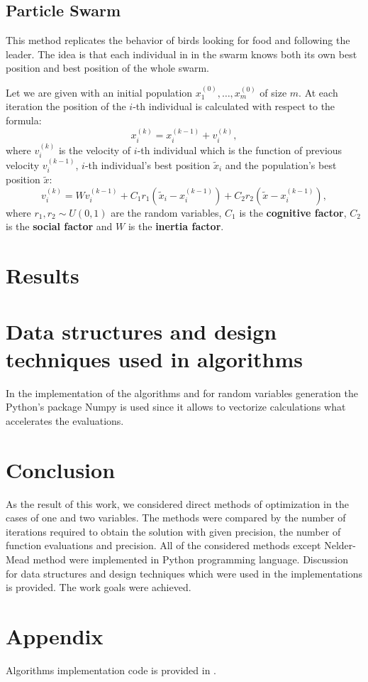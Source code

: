 \documentclass[12pt, bachelor, substylefile = algo_title.rtx]{disser}
\theoremstyle{definition}
\begin{document}
\subsection{Particle Swarm}
This method replicates the behavior of birds looking for food and following the leader. The idea is that each individual in in the swarm knows both its own best position and best position of the whole swarm.

Let we are given with an initial population $x^{(0)}_1, \dots, x^{(0)}_m$ of size $m$. At each iteration the position of the $i$-th individual is calculated with respect to the formula: 
\[ x^{(k)}_i = x^{(k-1)}_i + v^{(k)}_i, \]
where $v^{(k)}_i$ is the velocity of $i$-th individual which is the function of previous velocity $v^{(k-1)}_i$, $i$-th individual's best position $\widetilde{x}_i$ and the population's best position $\widetilde{x}$:
\[ v^{(k)}_i =  W v^{(k-1)}_i + C_1 r_1 (\widetilde{x}_i - x^{(k-1)}_i) + C_2 r_2(\widetilde{x} - x^{(k-1)}_i),\]
where $r_1,r_2 \sim U(0, 1)$ are the random variables, $C_1$ is the \textbf{cognitive factor}, $C_2$ is the \textbf{social factor} and $W$ is the \textbf{inertia factor}.

\section{Results}

\section{Data structures and design techniques used in algorithms}


In the implementation of the algorithms and for random variables generation the Python's package Numpy is used since it allows to vectorize calculations what accelerates the evaluations.


\section{Conclusion}
As the result of this work, we considered direct methods of optimization in the cases of one and two variables. The methods were compared by the number of iterations required to obtain the solution with given precision, the number of function evaluations and precision. All of the considered methods except Nelder-Mead method were implemented in Python programming language.
Discussion for data structures and design techniques which were used in the implementations is provided. The work goals were achieved.

\section{Appendix}
Algorithms implementation code is provided in \cite{repogithub}.

\nocite{Deisenroth2020}

{\small }

\end{document}
